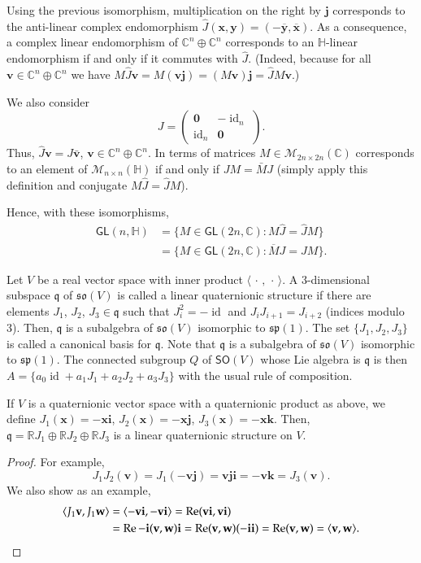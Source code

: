 \documentclass[12pt, a4paper,draft]{amsart}
\newcommand{\id}{\operatorname{id}}
\newcommand{\g}{\mathfrak}
\newcommand{\R}{\mathbb{R}}
\newcommand{\C}{\mathbb{C}}
\renewcommand{\H}{\mathbb{H}}
\renewcommand{\Re}{\operatorname{Re}}
\theoremstyle{remark}
\begin{document}
Using the previous isomorphism, multiplication on the right by $\mathbf{j}$ corresponds to the anti-linear complex endomorphism $\hat{J}(\mathbf{x},\mathbf{y})=(-\overline{\mathbf{y}},\overline{\mathbf{x}})$.
As a consequence, a complex linear endomorphism of $\C^n\oplus\C^n$ corresponds to an $\H$-linear endomorphism if and only if it commutes with $\hat{J}$. 
(Indeed, because for all $\mathbf{v}\in\C^n\oplus\C^n$ we have $M\hat{J}\mathbf{v}=M(\mathbf{v}\mathbf{j})=(M\mathbf{v})\mathbf{j}=\hat{J}M\mathbf{v}$.)

We also consider
\[
{J}=
\begin{pmatrix}
\mathbf{0} & -\id_n\\
\id_n & \mathbf{0}
\end{pmatrix}.
\]
Thus, $\hat{J}\mathbf{v}=J\bar{\mathbf{v}}$, $\mathbf{v}\in\C^n\oplus\C^n$.
In terms of matrices $M\in\mathcal{M}_{2n\times 2n}(\C)$ corresponds to an element of $\mathcal{M}_{n\times n}(\H)$ if and only if $JM=\bar{M}J$
(simply apply this definition and conjugate $M\hat{J}=\hat{J}M$).

Hence, with these isomorphisms, 
\[
\begin{aligned}
\mathsf{GL}(n,\H)
&{}=\{M\in\mathsf{GL}(2n,\C):M\hat{J}=\hat{J}M\}\\
&{}=\{M\in\mathsf{GL}(2n,\C):\overline{M}J=JM\}.
\end{aligned}
\]
\medskip

Let $V$ be a real vector space with inner product $\langle\,\cdot\,,\,\cdot\,\rangle$.
A $3$-dimensional subspace $\g{q}$ of $\g{so}(V)$ is called a linear quaternionic structure if there are elements $J_1$, $J_2$, $J_3\in\g{q}$ such that $J_i^2=-\id$ and $J_iJ_{i+1}=J_{i+2}$ (indices modulo 3).
Then, $\g{q}$ is a subalgebra of $\g{so}(V)$ isomorphic to $\g{sp}(1)$.
The set $\{J_1,J_2,J_3\}$ is called a canonical basis for $\g{q}$.
Note that $\g{q}$ is a subalgebra of $\g{so}(V)$ isomorphic to $\g{sp}(1)$.
The  connected subgroup $Q$ of $\mathsf{SO}(V)$ whose Lie algebra is $\g{q}$ is then
$A=\{a_0\id+a_1 J_1+a_2 J_2+a_3 J_3\}$ with the usual rule of composition.

If $V$ is a quaternionic vector space with a quaternionic product as above, we define $J_1(\mathbf{x})=-\mathbf{x}\mathbf{i}$, $J_2(\mathbf{x})=-\mathbf{x}\mathbf{j}$, $J_3(\mathbf{x})=-\mathbf{x}\mathbf{k}$.
Then, $\g{q}=\R J_1\oplus\R J_2\oplus\R J_3$ is a linear quaternionic structure on $V$.

\begin{proof}
For example,
\[
J_1 J_2(\mathbf{v})
=J_1(-\mathbf{v}\mathbf{j})
=\mathbf{v}\mathbf{j}\mathbf{i}
=-\mathbf{v}\mathbf{k}
=J_3(\mathbf{v}).
\]
We also show as an example,
\begin{align*}
\langle J_1\mathbf{v},J_1\mathbf{w}\rangle
&{}=\langle -\mathbf{v}\mathbf{i},-\mathbf{v}\mathbf{i}\rangle
=\Re (\mathbf{v}\mathbf{i},\mathbf{v}\mathbf{i})\\
&{}=\Re -\mathbf{i} (\mathbf{v},\mathbf{w}) \mathbf{i}
=\Re (\mathbf{v},\mathbf{w}) (-\mathbf{i}\mathbf{i})
=\Re (\mathbf{v},\mathbf{w})
=\langle \mathbf{v},\mathbf{w}\rangle.\qedhere
\end{align*}
\end{proof}
\end{document}
